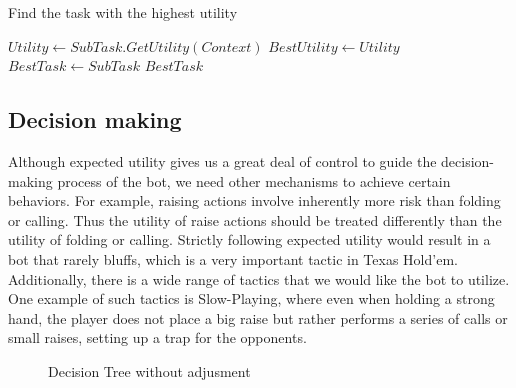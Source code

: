 \begin{Algorithmus}[H]
    \caption{Find the task with the highest utility}
    \label{alg:bestTask}
    \begin{algorithmic}
                    \State $Utility \gets SubTask.GetUtility(Context)$
                        \State $BestUtility \gets Utility$
                        \State $BestTask \gets SubTask$
                    \EndIf
                \EndIf
            \EndFor
            \State \Return $BestTask$
        \EndProcedure
    \end{algorithmic}
\end{Algorithmus}


\subsection{Decision making}

Although expected utility gives us a great deal of control to guide the decision-making process of the bot, we need other mechanisms to achieve certain behaviors. For example, raising actions involve inherently more risk than folding or calling. Thus the utility of raise actions should be treated differently than the utility of folding or calling. 
Strictly following expected utility would result in a bot that rarely bluffs, which is a very important tactic in Texas Hold'em. Additionally, there is a wide range of tactics that we would like the bot to utilize. One example of such tactics is Slow-Playing, where even when holding a strong hand, the player does not place a big raise but rather performs a series of calls or small raises, setting up a trap for the opponents. 

\begin{figure}[h]
    \centering
    \caption{Decision Tree without adjusment}
\end{figure}

